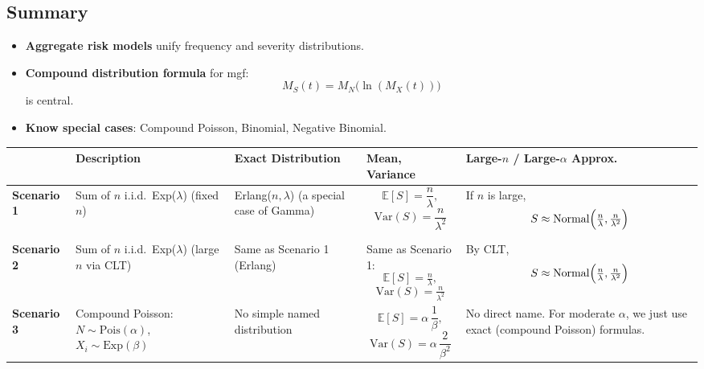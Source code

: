\documentclass[13pt,a4paper]{article}
\begin{document}
\subsection{Summary}
\begin{itemize}
  \item \textbf{Aggregate risk models} unify frequency and severity distributions.
  \item \textbf{Compound distribution formula} for mgf:
    \[
      M_S(t)=M_N\bigl(\ln(M_X(t))\bigr)
    \]
    is central.  
  \item \textbf{Know special cases}: Compound Poisson, Binomial, Negative Binomial.  
\end{itemize}


\begin{table}[ht]
    \centering
    \renewcommand{\arraystretch}{4.0}
    \begin{tabular}{l p{3.0cm} p{3.4cm} p{3.6cm} p{3.9cm}}
    \hline
    & \textbf{Description}
    & \textbf{Exact Distribution}
    & \textbf{Mean, Variance}
    & \textbf{Large-$n$ / Large-$\alpha$ Approx.}\\
    \hline
    \textbf{Scenario 1} 
    & \parbox{3.0cm}{\centering Sum of $n$ i.i.d.\ Exp($\lambda$) \\(fixed $n$)}
    & \parbox{3.4cm}{Erlang($n,\lambda$) (a special case of Gamma)}
    & \parbox{3.6cm}{ \centering
      \[\displaystyle \mathbb{E}[S] = \frac{n}{\lambda}, \]
       \[\mathrm{Var}(S) = \frac{n}{\lambda^2}\]}
    & \parbox{3.9cm}{ \centering
      If $n$ is large, 
      \[\,S \approx \mathrm{Normal}\Bigl(\tfrac{n}{\lambda}, \tfrac{n}{\lambda^2}\Bigr)\]}
    \\[1em]
    
    \textbf{Scenario 2} 
    & \parbox{3.0cm}{\centering Sum of $n$ i.i.d.\ Exp($\lambda$) \\ (large $n$ via CLT)}
    & \parbox{3.4cm}{\centering Same as Scenario 1 (Erlang)}
    & \parbox{3.6cm}{\centering Same as Scenario 1: 
      \[\mathbb{E}[S]=\tfrac{n}{\lambda}, \]
       \[\mathrm{Var}(S)=\tfrac{n}{\lambda^2}\]}
    & \parbox{3.9cm}{
      By CLT, 
      \[\,S \approx \mathrm{Normal}\Bigl(\tfrac{n}{\lambda}, \tfrac{n}{\lambda^2}\Bigr)\]}
    \\[1em]
    
    \textbf{Scenario 3} 
    & \parbox{3.0cm}{\centering Compound Poisson: \\ $N\!\sim \mathrm{Pois}(\alpha)$, \\ $X_i\!\sim \mathrm{Exp}(\beta)$}
    & \parbox{3.4cm}{\centering No simple named distribution}
    & \parbox{3.6cm}{\centering
      \[\displaystyle \mathbb{E}[S] = \alpha\,\frac{1}{\beta}, \]
       \[\mathrm{Var}(S) = \alpha\,\frac{2}{\beta^2}\]}
    & \parbox{3.9cm}{ \centering
      No direct name.  
      For moderate $\alpha$, we just use exact (compound Poisson) formulas.}
    \\[1em]
    

\end{tabular}
\end{table}
\end{document}
